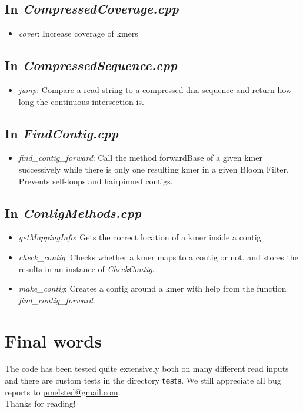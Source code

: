 \documentclass[a4paper]{report}
\renewcommand{\b}[1]{\textbf{#1}}  %
\renewcommand{\i}[1]{\textit{#1}}  %
\begin{document}
\section{In \i{CompressedCoverage.cpp}}

\begin{itemize}
\item \i{cover}: Increase coverage of kmers
\end{itemize}

\section{In \i{CompressedSequence.cpp}}

\begin{itemize}
\item \i{jump}: Compare a read string to a compressed dna sequence and return how long the continuous intersection is.
\end{itemize}

\section{In \i{FindContig.cpp}}

\begin{itemize}
\item \i{find\_contig\_forward}: Call the method forwardBase of a given kmer successively while there is only one resulting kmer
in a given Bloom Filter. Prevents self-loops and hairpinned contigs.
\end{itemize}

\section{In \i{ContigMethods.cpp}}
\begin{itemize}
\item \i{getMappingInfo}: Gets the correct location of a kmer inside a contig.
\item \i{check\_contig}: Checks whether a kmer maps to a contig or not, and stores the results in an instance of \i{CheckContig}.
\item \i{make\_contig}: Creates a contig around a kmer with help from the function \i{find\_contig\_forward}.
\end{itemize}



\chapter{Final words}

The code has been tested quite extensively both on many different read inputs and there are custom tests in the directory \b{tests}.
We still appreciate all bug reports to \href{mailto:pmelsted@gmail.com}{pmelsted@gmail.com}.\\[4pt]

Thanks for reading!

\vfill

\printbibliography                                                                                                                                   
\end{document}
